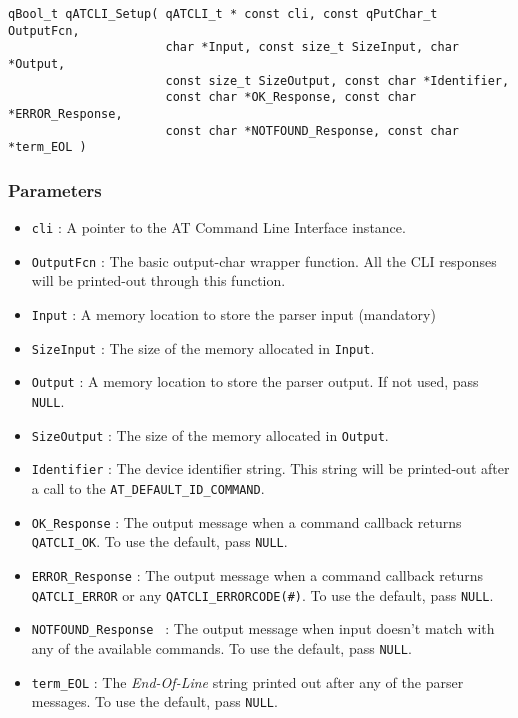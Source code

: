 \begin{lstlisting}[style=CStyle]
qBool_t qATCLI_Setup( qATCLI_t * const cli, const qPutChar_t OutputFcn, 
                      char *Input, const size_t SizeInput, char *Output, 
                      const size_t SizeOutput, const char *Identifier, 
                      const char *OK_Response, const char *ERROR_Response, 
                      const char *NOTFOUND_Response, const char *term_EOL )
\end{lstlisting}

\subsubsection*{Parameters}
\begin{itemize}
    \item \lstinline{cli} : A pointer to the AT Command Line Interface instance. 
    \item \lstinline{OutputFcn} : The basic output-char wrapper function. All the CLI responses  will be printed-out through this function.
    \item \lstinline{Input} : A memory location to store the parser input (mandatory) 
    \item \lstinline{SizeInput} : The size of the memory allocated in \lstinline{Input}. 
    \item \lstinline{Output} : A memory location to store the parser output. If not used, pass \lstinline{NULL}.
    \item \lstinline{SizeOutput} : The size of the memory allocated in \lstinline{Output}. 
    \item \lstinline{Identifier} : The device identifier string. This string will be printed-out after a call to the \lstinline{AT_DEFAULT_ID_COMMAND}.
    \item \lstinline{OK_Response} : The output message when a command callback returns \lstinline{QATCLI_OK}. To use the default, pass \lstinline{NULL}.
    \item \lstinline{ERROR_Response} : The output message when a command callback returns \lstinline{QATCLI_ERROR} or any \lstinline{QATCLI_ERRORCODE(#)}. To use the default, pass \lstinline{NULL}.
    \item \lstinline{NOTFOUND_Response } : The output message when input doesn't match with any of  the available commands. To use the default, pass \lstinline{NULL}.
    \item \lstinline{term_EOL} : The \textit{End-Of-Line} string printed out after any of the parser messages. To use the default, pass \lstinline{NULL}. 
\end{itemize}

